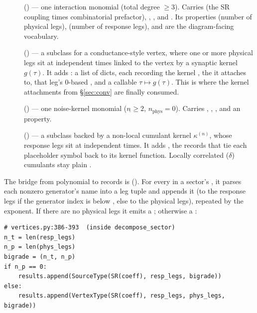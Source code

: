 \begin{description}
  \item[] () --- one interaction monomial
        (total degree $\ge 3$). Carries  (the SR coupling times
        combinatorial prefactor), , , and
        . Its properties  (number of physical legs),
         (number of response legs), and  are
        the diagram-facing vocabulary.
  \item[] () --- a 
        subclass for a conductance-style vertex, where one or more physical legs sit
        at independent times linked to the vertex by a synaptic kernel $g(\tau)$. It
        adds : a list of dicts, each recording the kernel
        , the  it attaches to, that leg's 0-based
        , and a  callable
        $\tau\mapsto g(\tau)$. This is where the kernel attachments from
        \S\ref{sec:conv} are finally consumed.
  \item[] () --- one noise-kernel monomial
        ($n_{\tilde{}}\ge 2$, $n_{\mathrm{phys}}=0$). Carries ,
        , , and an  property.
  \item[] () --- a 
        subclass backed by a non-local cumulant kernel $\kappa^{(n)}$, whose response
        legs sit at independent times. It adds , the records
        that tie each placeholder symbol back to its kernel function. Locally
        correlated ($\delta$) cumulants stay plain .
\end{description}

The bridge from polynomial to records is 
(). For every  in a
sector's , it parses each nonzero generator's name into a leg tuple and
appends it (to the response legs if the generator index is below , else
to the physical legs), repeated by the exponent. If there are no physical legs it
emits a ; otherwise a :

\begin{lstlisting}
# vertices.py:386-393  (inside decompose_sector)
n_t = len(resp_legs)
n_p = len(phys_legs)
bigrade = (n_t, n_p)
if n_p == 0:
    results.append(SourceType(SR(coeff), resp_legs, bigrade))
else:
    results.append(VertexType(SR(coeff), resp_legs, phys_legs, bigrade))
\end{lstlisting}


